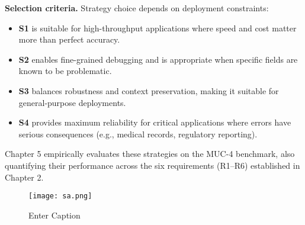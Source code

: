 \textbf{Selection criteria.} Strategy choice depends on deployment constraints:
\begin{itemize}
    \item \textbf{S1} is suitable for high-throughput applications where speed and cost matter more than perfect accuracy.
    \item \textbf{S2} enables fine-grained debugging and is appropriate when specific fields are known to be problematic.
    \item \textbf{S3} balances robustness and context preservation, making it suitable for general-purpose deployments.
    \item \textbf{S4} provides maximum reliability for critical applications where errors have serious consequences (e.g., medical records, regulatory reporting).
\end{itemize}

Chapter 5 empirically evaluates these strategies on the MUC-4 benchmark, also quantifying their performance across the six requirements (R1–R6) established in Chapter 2.\begin{figure}
    \centering
    \texttt{[image: sa.png]}
    \caption{Enter Caption}
    \label{fig:placeholder}
\end{figure}

